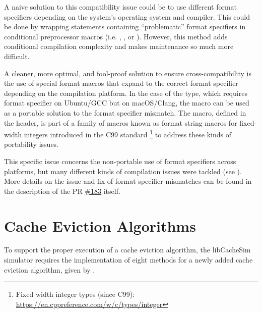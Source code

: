 \begin{description}[style=unboxed, leftmargin=0cm]
    \item[Naive solution] A naive solution to this compatibility issue could be to use different format specifiers depending on the system's operating system and compiler. This could be done by wrapping  statements containing \enquote{problematic} format specifiers in conditional preprocessor macros (i.e. , , or ). However, this method adds conditional compilation complexity and makes maintenance so much more difficult. 
    \item[Improved solution] A cleaner, more optimal, and fool-proof solution to ensure cross-compatibility is the use of special format macros that expand to the correct format specifier depending on the compilation platform. In the case of the  type, which requires format specifier  on Ubuntu/GCC but  on macOS/Clang, the  macro can be used as a portable solution to the format specifier mismatch. The  macro, defined in the  header, is part of a family of macros known as format string macros for fixed-width integers introduced in the C99 standard \footnote{Fixed width integer types (since C99): \url{https://en.cppreference.com/w/c/types/integer}} to address these kinds of portability issues.
\end{description}

This specific issue concerns the non-portable use of format specifiers across platforms, but many different kinds of compilation issues were tackled (see ). More details on the issue and fix of format specifier mismatches can be found in the description of the PR \href{https://github.com/1a1a11a/libCacheSim/pull/183}{\#183} itself.





\section{Cache Eviction Algorithms}\label{sec: cache-eviction-algs}

To support the proper execution of a cache eviction algorithm, the libCacheSim simulator requires the implementation of eight methods for a newly added cache eviction algorithm, given by .



